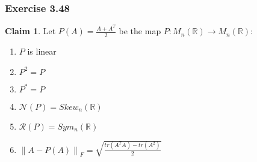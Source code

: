 \documentclass[letterpaper,12pt]{article}
\theoremstyle{definition}
\newtheorem{claim}[theorem]{Claim}
\newcommand{\norm}[1]{\left\lVert#1\right\rVert}
\begin{document}
\subsubsection*{Exercise 3.48}
\begin{claim}
	Let $P(A) = \frac{A + A^T}{2}$ be the map $P: M_n(\mathbb{R}) \to M_n(\mathbb{R})$:
	\begin{enumerate}
		\item $P$ is linear
		\item $P^2  = P$ 
		\item $P^* = P$ 
		\item $\mathscr{N}(P) = Skew_n(\mathbb{R})$
		\item $\mathscr{R}(P) = Sym_n(\mathbb{R})$
		\item $\norm{A-P(A)}_F = \sqrt{\frac{tr(A^TA) - tr(A^2)}{2}}$
	\end{enumerate}
\end{claim}
\end{document}
